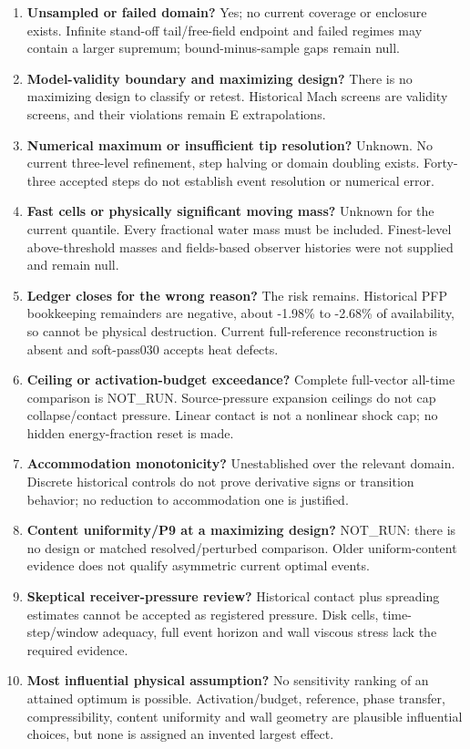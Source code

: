 \documentclass[10pt,a4paper]{article}
\begin{document}
\begin{enumerate}[label=\textbf{\arabic*.},itemsep=6pt]
\item \textbf{Unsampled or failed domain?} Yes; no current coverage or enclosure exists. Infinite stand-off tail/free-field endpoint and failed regimes may contain a larger supremum; bound-minus-sample gaps remain null.
\item \textbf{Model-validity boundary and maximizing design?} There is no maximizing design to classify or retest. Historical Mach screens are validity screens, and their violations remain E extrapolations.
\item \textbf{Numerical maximum or insufficient tip resolution?} Unknown. No current three-level refinement, step halving or domain doubling exists. Forty-three accepted steps do not establish event resolution or numerical error.
\item \textbf{Fast cells or physically significant moving mass?} Unknown for the current quantile. Every fractional water mass must be included. Finest-level above-threshold masses and fields-based observer histories were not supplied and remain null.
\item \textbf{Ledger closes for the wrong reason?} The risk remains. Historical PFP bookkeeping remainders are negative, about -1.98\% to -2.68\% of availability, so cannot be physical destruction. Current full-reference reconstruction is absent and soft-pass030 accepts heat defects.
\item \textbf{Ceiling or activation-budget exceedance?} Complete full-vector all-time comparison is NOT\_RUN. Source-pressure expansion ceilings do not cap collapse/contact pressure. Linear contact is not a nonlinear shock cap; no hidden energy-fraction reset is made.
\item \textbf{Accommodation monotonicity?} Unestablished over the relevant domain. Discrete historical controls do not prove derivative signs or transition behavior; no reduction to accommodation one is justified.
\item \textbf{Content uniformity/P9 at a maximizing design?} NOT\_RUN: there is no design or matched resolved/perturbed comparison. Older uniform-content evidence does not qualify asymmetric current optimal events.
\item \textbf{Skeptical receiver-pressure review?} Historical contact plus spreading estimates cannot be accepted as registered pressure. Disk cells, time-step/window adequacy, full event horizon and wall viscous stress lack the required evidence.
\item \textbf{Most influential physical assumption?} No sensitivity ranking of an attained optimum is possible. Activation/budget, reference, phase transfer, compressibility, content uniformity and wall geometry are plausible influential choices, but none is assigned an invented largest effect.
\end{enumerate}
\end{document}
